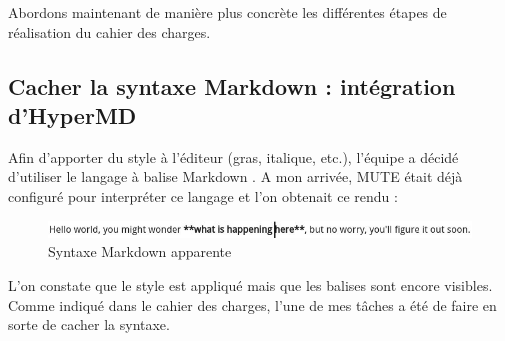 \documentclass[12pt]{article}
\begin{document}
\newpage
Abordons maintenant de manière plus concrète les différentes étapes de réalisation du cahier des charges.\\

\subsection{Cacher la syntaxe Markdown : intégration d'HyperMD}
Afin d'apporter du style à l'éditeur (gras, italique, etc.), l'équipe a décidé d'utiliser le langage à balise Markdown \cite{markdown}. A mon arrivée, MUTE était déjà configuré pour interpréter ce langage et l'on obtenait ce rendu :

\begin{figure}[H]
    \centering
    \includegraphics[scale=0.65]{gallery/style_example.jpg}
    \caption[nom dans le sommaire]{Syntaxe Markdown apparente}
    \label{fig:gallery3}
\end{figure}

L'on constate que le style est appliqué mais que les balises sont encore visibles. Comme indiqué dans le cahier des charges, l'une de mes tâches a été de faire en sorte de cacher la syntaxe.
\end{document}
